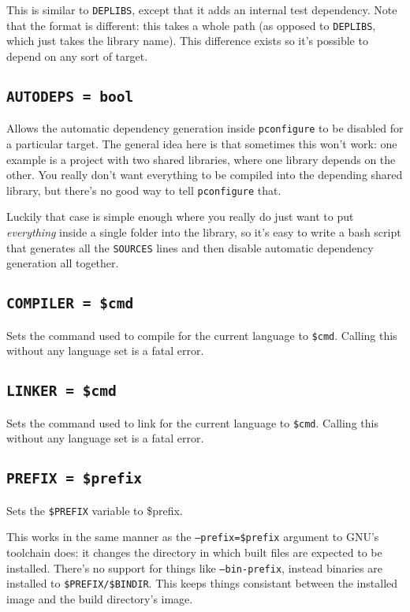 \documentclass{article}
\begin{document}
This is similar to \texttt{DEPLIBS}, except that it adds an internal
test dependency.  Note that the format is different: this takes a
whole path (as opposed to \texttt{DEPLIBS}, which just takes the
library name).  This difference exists so it's possible to depend on
any sort of target.

\subsection{\texttt{AUTODEPS = bool} \label{cmd:autodeps}}

Allows the automatic dependency generation inside \texttt{pconfigure}
to be disabled for a particular target.  The general idea here is that
sometimes this won't work: one example is a project with two shared
libraries, where one library depends on the other.  You really don't
want everything to be compiled into the depending shared library, but
there's no good way to tell \texttt{pconfigure} that.

Luckily that case is simple enough where you really do just want to
put \textit{everything} inside a single folder into the library, so
it's easy to write a bash script that generates all the
\texttt{SOURCES} lines and then disable automatic dependency
generation all together.

\subsection{\texttt{COMPILER = \$cmd}}

Sets the command used to compile for the current language to
\texttt{\$cmd}.  Calling this without any language set is a fatal
error.

\subsection{\texttt{LINKER = \$cmd}}

Sets the command used to link for the current language to
\texttt{\$cmd}.  Calling this without any language set is a fatal
error.

\subsection{\texttt{PREFIX = \$prefix}}

Sets the \texttt{\$PREFIX} variable to \$prefix.

This works in the same manner as the \texttt{--prefix=\$prefix}
argument to GNU's toolchain does: it changes the directory in which
built files are expected to be installed.  There's no support for
things like \texttt{--bin-prefix}, instead binaries are installed to
\texttt{\$PREFIX/\$BINDIR}.  This keeps things consistant between the
installed image and the build directory's image.
\end{document}
